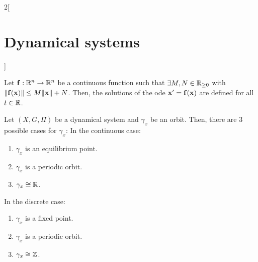 \documentclass[../../../main_math.tex]{subfiles}
\begin{document}
\begin{multicols}{2}[\section{Dynamical systems}]
\begin{lemma}
    Let $\boldsymbol{\mathrm{f}}:\mathbb{R}^n\rightarrow\mathbb{R}^n$ be a continuous function such that $\exists M,N\in\mathbb{R}_{\geq 0}$ with $\|\boldsymbol{\mathrm{f}}(\boldsymbol{\mathrm{x}})\|\leq M\|\boldsymbol{\mathrm{x}}\|+N$. Then, the solutions of the ode $\boldsymbol{\mathrm{x}}' =\boldsymbol{\mathrm{f}}(\boldsymbol{\mathrm{x}})$ are defined for all $t\in\mathbb{R}$.
  \end{lemma}
  \begin{theorem}
    Let $(X,G,\Pi)$ be a dynamical system and $\gamma_x$ be an orbit. Then, there are 3 possible cases for $\gamma_x$:
    In the continuous case:
    \begin{enumerate}
      \item $\gamma_x$ is an equilibrium point.
      \item $\gamma_x$ is a periodic orbit.
      \item $\gamma_x\cong\mathbb{R}$.
    \end{enumerate}
    In the discrete case:
    \begin{enumerate}
      \item $\gamma_x$ is a fixed point.
      \item $\gamma_x$ is a periodic orbit.
      \item $\gamma_x\cong\mathbb{Z}$.
    \end{enumerate}
  \end{theorem}

\end{multicols}
\end{document}
